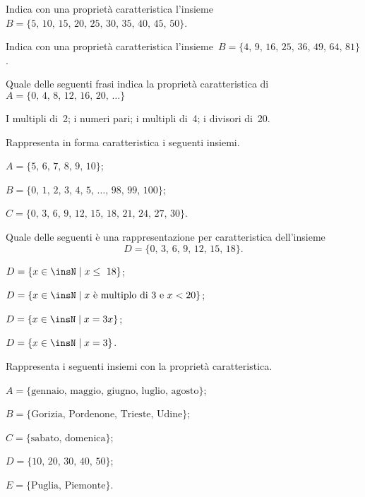 \begin{esercizio}
\label{ese:6.12}
Indica con una proprietà caratteristica l'insieme~$B=\{\text{5, 10, 15, 20, 25, 30, 35, 40, 45, 50}\}$.
\end{esercizio}

\begin{esercizio}
\label{ese:6.13}
Indica con una proprietà caratteristica
l'insieme~$B=\{\text{4, 9, 16, 25, 36, 49, 64, 81}\}$.
\end{esercizio}

\begin{esercizio}
\label{ese:6.14}
Quale delle seguenti frasi indica la proprietà caratteristica
di~$A=\{\text{0, 4, 8, 12, 16, 20, }\ldots\}$
\begin{center}
\boxA\quad I multipli di~2; \quad\boxB\quad i numeri pari; \quad\boxC\quad i multipli di~4; \quad\boxD\quad i divisori di~20.
\end{center}
\end{esercizio}

\begin{esercizio}
\label{ese:6.15}
Rappresenta in forma caratteristica i seguenti insiemi.
\begin{enumeratea}
\item $A=\{\text{5, 6, 7, 8, 9, 10}\}$;
\item $B=\{\text{0, 1, 2, 3, 4, 5, \ldots, 98, 99, 100}\}$;
\item$ C=\{\text{0, 3, 6, 9, 12, 15, 18, 21, 24, 27, 30}\}$.
\end{enumeratea}
\end{esercizio}

\begin{esercizio}
\label{ese:6.16}
Quale delle seguenti è una rappresentazione per caratteristica
dell'insieme
\[D = \{\text{0, 3, 6, 9, 12, 15, 18}\}.\]
\begin{enumeratea}
\item $D=\{x\in\insN\mid x\le~18\}$;
\item $D=\{x\in\insN\mid x\text{ è multiplo di~3 e }x<20\}$;%
\item $D=\{x\in\insN\mid x=3x\}$;
\item $D=\{x\in\insN\mid x=3\}$.
\end{enumeratea}
\end{esercizio}

\begin{esercizio}
\label{ese:6.17}
Rappresenta i seguenti insiemi con la proprietà caratteristica.
\begin{enumeratea}
 \item $A=\{\text{gennaio, maggio, giugno, luglio, agosto}\}$;
 \item $B=\{\text{Gorizia, Pordenone, Trieste, Udine}\}$;
 \item $C=\{\text{sabato, domenica}\}$;
 \item $D=\{\text{10, 20, 30, 40, 50}\}$;
 \item $E=\{\text{Puglia, Piemonte}\}$.
 \end{enumeratea}
\end{esercizio}

